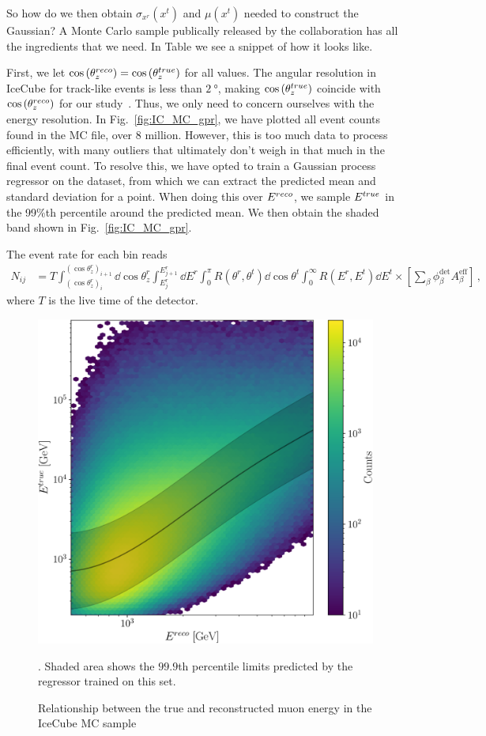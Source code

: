 \documentclass[draft=True]{thesis}
\begin{document}
So how do we then obtain $\sigma_{x^r}(x^t)$ and $\mu(x^t)$ needed to construct the Gaussian? A Monte Carlo sample publically released by the 
collaboration has all the ingredients that we need. %
In Table %
we see a snippet of how it looks like. 

First, we let $\cos{(\theta_z^{reco})} = \cos{(\theta_z^{true})}$ for all values. The angular resolution in IceCube for track-like events is less than $\SI{2}{\degree}$, making $\cos{(\theta_z^{true})}$ coincide with $\cos{(\theta_z^{reco})}$ for our study~\cite{IC2020}.
Thus, we only need to concern ourselves with the energy resolution.
In Fig.~\ref{fig:IC_MC_gpr}, we have plotted all event counts found in the MC file, over 8 million. However, this is too much data to process efficiently, with many outliers that ultimately don't weigh in 
that much in the final event count. To resolve this, we have opted to train a Gaussian process regressor on the dataset, from which we can extract the predicted mean and standard deviation for a point.
When doing this over $E^{reco}$, we sample $E^{true}$ in the 99\%th percentile around the predicted mean. We then obtain the shaded band shown in Fig.~\ref{fig:IC_MC_gpr}. %

The event rate for each bin reads
\begin{align}\label{eq:ICevents}
    N_{ij} &= T \int_{(\cos{\theta_z^r})_i}^{(\cos{\theta_z^r})_{i+1}} \dd \cos{\theta^r_z} \int_{E^r_{j}}^{E^r_{j+1}} \dd E^r \int_0^\pi R(\theta^r,\theta^t) \dd \cos{\theta^t} \int_0^\infty R(E^r,E^t) \dd E^t
    \times \left[ \sum_\beta \phi_\beta^\text{det}  A^\text{eff}_\beta\right]\,,
\end{align}
where $T$ is the live time of the detector.

\begin{figure}[!tb]\label{fig:IC_MC_gpr}
    \begin{center}
       \includegraphics[width=0.4\linewidth]{figures/IC_MC_gpr.pdf} %
    \end{center}
    \caption{Relationship between the true and reconstructed muon energy in the IceCube MC sample~\cite{IC2016}}\label{fig:IC_MC_counts}. Shaded area shows the $99.9$th percentile limits predicted by the regressor trained on this set.
 \end{figure}



    
\end{document}

